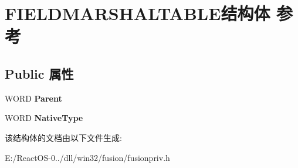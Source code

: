 \hypertarget{struct_f_i_e_l_d_m_a_r_s_h_a_l_t_a_b_l_e}{}\section{F\+I\+E\+L\+D\+M\+A\+R\+S\+H\+A\+L\+T\+A\+B\+L\+E结构体 参考}
\label{struct_f_i_e_l_d_m_a_r_s_h_a_l_t_a_b_l_e}
\subsection*{Public 属性}
\begin{DoxyCompactItemize}
\item 
\mbox{\label{struct_f_i_e_l_d_m_a_r_s_h_a_l_t_a_b_l_e_a314b2ecdfe45a015d994250956702ee9}} 
W\+O\+RD {\bfseries Parent}
\item 
\mbox{\label{struct_f_i_e_l_d_m_a_r_s_h_a_l_t_a_b_l_e_a9becc6a11cdc0a36660ec97c35860136}} 
W\+O\+RD {\bfseries Native\+Type}
\end{DoxyCompactItemize}


该结构体的文档由以下文件生成\+:\begin{DoxyCompactItemize}
\item 
E\+:/\+React\+O\+S-\/0../dll/win32/fusion/fusionpriv.\+h\end{DoxyCompactItemize}
